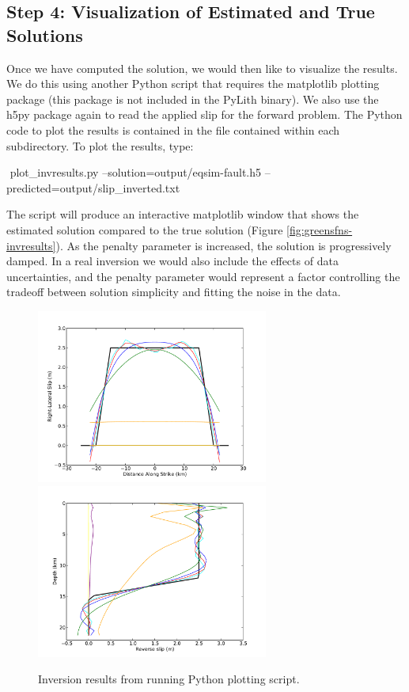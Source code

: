 \subsection{Step 4: Visualization of Estimated and True Solutions}

Once we have computed the solution, we would then like to visualize
the results. We do this using another Python script that requires
the matplotlib plotting package (this package is not included in the
PyLith binary). We also use the h5py package again to read the applied
slip for the forward problem. The Python code to plot the results
is contained in the  file contained within
each subdirectory. To plot the results, type:
\begin{shell}
$$ plot_invresults.py --solution=output/eqsim-fault.h5 --predicted=output/slip_inverted.txt
\end{shell}
The script will produce an interactive matplotlib window that shows
the estimated solution compared to the true solution (Figure
\vref{fig:greensfns-invresults}).  As the penalty parameter is
increased, the solution is progressively damped. In a real inversion
we would also include the effects of data uncertainties, and the
penalty parameter would represent a factor controlling the tradeoff
between solution simplicity and fitting the noise in the data.

\begin{figure}
  \includegraphics[width=3in]{examples/figs/greensfns2d_strikeslip_inversion}
  \includegraphics[width=3in]{examples/figs/greensfns2d_reverse_inversion}
  \caption{Inversion results from running Python plotting script.}
  \label{fig:greensfns-invresults}
\end{figure}


